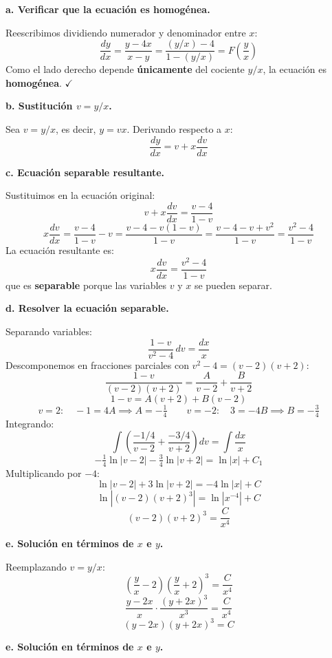 \begin{respuesta}

\textbf{a. Verificar que la ecuación es homogénea.}

Reescribimos dividiendo numerador y denominador entre $x$:
\[
    \frac{dy}{dx} = \frac{y - 4x}{x - y} 
    = \frac{(y/x) - 4}{1 - (y/x)}
    = F\!\left(\frac{y}{x}\right)
\]
Como el lado derecho depende \textbf{únicamente} del cociente $y/x$,
la ecuación es \textbf{homogénea}. $\checkmark$

\medskip
\textbf{b. Sustitución $v = y/x$.}

Sea $v = y/x$, es decir, $y = vx$. Derivando respecto a $x$:
\[
    \frac{dy}{dx} = v + x\frac{dv}{dx}
\]

\medskip
\textbf{c. Ecuación separable resultante.}

Sustituimos en la ecuación original:
\[
    v + x\frac{dv}{dx} = \frac{v - 4}{1 - v}
\]
\[
    x\frac{dv}{dx} = \frac{v-4}{1-v} - v 
    = \frac{v - 4 - v(1-v)}{1-v}
    = \frac{v - 4 - v + v^2}{1-v}
    = \frac{v^2 - 4}{1-v}
\]
La ecuación resultante es:
\[
    x\frac{dv}{dx} = \frac{v^2 - 4}{1 - v}
\]
que es \textbf{separable} porque las variables $v$ y $x$ se pueden separar.

\medskip
\textbf{d. Resolver la ecuación separable.}

Separando variables:
\[
    \frac{1-v}{v^2 - 4}\,dv = \frac{dx}{x}
\]
Descomponemos en fracciones parciales con $v^2-4 = (v-2)(v+2)$:
\[
    \frac{1-v}{(v-2)(v+2)} = \frac{A}{v-2} + \frac{B}{v+2}
\]
\[
    1-v = A(v+2) + B(v-2)
\]
\[
    v = 2:\quad -1 = 4A \implies A = -\tfrac{1}{4}
    \qquad
    v = -2:\quad 3 = -4B \implies B = -\tfrac{3}{4}
\]
Integrando:
\[
    \int\!\left(\frac{-1/4}{v-2} + \frac{-3/4}{v+2}\right)dv = \int\frac{dx}{x}
\]
\[
    -\tfrac{1}{4}\ln|v-2| - \tfrac{3}{4}\ln|v+2| = \ln|x| + C_1
\]
Multiplicando por $-4$:
\[
    \ln|v-2| + 3\ln|v+2| = -4\ln|x| + C
\]
\[
    \ln\!\left|(v-2)(v+2)^3\right| = \ln\!\left|x^{-4}\right| + C
\]
\[
    (v-2)(v+2)^3 = \frac{C}{x^4}
\]

\medskip
\textbf{e. Solución en términos de $x$ e $y$.}

Reemplazando $v = y/x$:
\[
    \left(\frac{y}{x} - 2\right)\!\left(\frac{y}{x}+2\right)^{\!3} = \frac{C}{x^4}
\]
\[
    \frac{y-2x}{x}\cdot\frac{(y+2x)^3}{x^3} = \frac{C}{x^4}
\]
\[
    \boxed{(y - 2x)(y + 2x)^3 = C}
\]

\medskip

\textbf{e. Solución en términos de $x$ e $y$.}


\end{respuesta}
